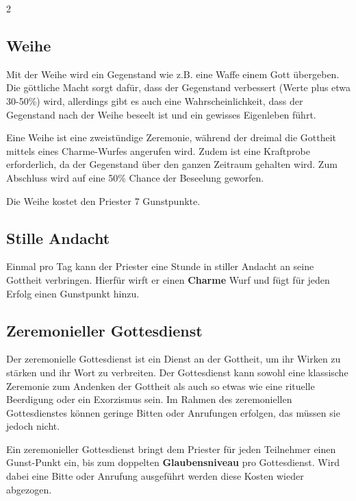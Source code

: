 \begin{multicols}{2}
\subsection{Weihe}

Mit der Weihe wird ein Gegenstand wie z.B. eine Waffe einem Gott übergeben. Die göttliche Macht sorgt dafür, dass der Gegenstand verbessert (Werte plus etwa 30-50\%) wird, allerdings gibt es auch eine Wahrscheinlichkeit, dass der Gegenstand nach der Weihe beseelt ist und ein gewisses Eigenleben führt.

Eine Weihe ist eine zweistündige Zeremonie, während der dreimal die Gottheit mittels eines Charme-Wurfes angerufen wird. Zudem ist eine Kraftprobe erforderlich, da der Gegenstand über den ganzen Zeitraum gehalten wird. Zum Abschluss wird auf eine 50\% Chance der Beseelung geworfen.

Die Weihe kostet den Priester 7 Gunstpunkte.

\subsection{Stille Andacht}

Einmal pro Tag kann der Priester eine Stunde in stiller Andacht an seine Gottheit verbringen. Hierfür wirft er einen \textbf{Charme} Wurf und fügt für jeden Erfolg einen Gunstpunkt hinzu.

\subsection{Zeremonieller Gottesdienst}

Der zeremonielle Gottesdienst ist ein Dienst an der Gottheit, um ihr Wirken zu stärken und ihr Wort zu verbreiten. Der Gottesdienst kann sowohl eine klassische Zeremonie zum Andenken der Gottheit als auch so etwas wie eine rituelle Beerdigung oder ein Exorzismus sein. Im Rahmen des zeremoniellen Gottesdienstes können geringe Bitten oder Anrufungen erfolgen, das müssen sie jedoch nicht.

Ein zeremonieller Gottesdienst bringt dem Priester für jeden Teilnehmer einen Gunst-Punkt ein, bis zum doppelten \textbf{Glaubensniveau} pro Gottesdienst. Wird dabei eine Bitte oder Anrufung ausgeführt werden diese Kosten wieder abgezogen.
\end{multicols}
